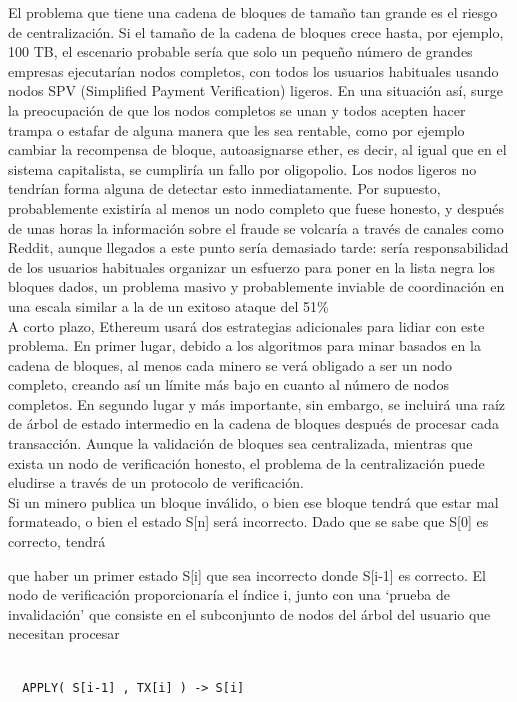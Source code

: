 \documentclass[11pt,a4paper]{article}
\begin{document}
El problema que tiene una cadena de bloques de tamaño tan grande es el riesgo de centralización. Si el tamaño de la cadena de bloques crece hasta, por ejemplo, 100 TB, el escenario probable sería que solo un pequeño número de grandes empresas ejecutarían nodos completos, con todos los usuarios habituales usando nodos SPV (Simplified Payment Verification) ligeros. En una situación así, surge la preocupación de que los nodos completos se unan y todos acepten hacer trampa o estafar de alguna manera que les sea rentable, como por ejemplo cambiar la recompensa de bloque, autoasignarse ether, es decir, al igual que en el sistema capitalista, se cumpliría un fallo por oligopolio. Los nodos ligeros no tendrían forma alguna de detectar esto inmediatamente. Por supuesto, probablemente existiría al menos un nodo completo que fuese honesto, y después de unas horas la información sobre el fraude se volcaría a través de canales como Reddit, aunque llegados a este punto sería demasiado tarde: sería responsabilidad de los usuarios habituales organizar un esfuerzo para poner en la lista negra los bloques dados, un problema masivo y probablemente inviable de coordinación en una escala similar a la de un exitoso ataque del 51\%\\

A corto plazo, Ethereum usará dos estrategias adicionales para lidiar con este problema. En primer lugar, debido a los algoritmos para minar basados en la cadena de bloques, al menos cada minero se verá obligado a ser un nodo completo, creando así un límite más bajo en cuanto al número de nodos completos. En segundo lugar y más importante, sin embargo, se incluirá una raíz de árbol de estado intermedio en la cadena de bloques después de procesar cada transacción. Aunque la validación de bloques sea centralizada, mientras que exista un nodo de verificación honesto, el problema de la centralización puede eludirse a través de un protocolo de verificación. \\ 
Si un minero publica un bloque inválido, o bien ese bloque tendrá que estar mal
formateado, o bien el estado S[n] será incorrecto. Dado que se sabe que S[0] es correcto, tendrá

que haber un primer estado S[i] que sea incorrecto donde S[i-1] es correcto. El nodo de
verificación proporcionaría el índice i, junto con una ‘prueba de invalidación’ que consiste en el subconjunto de nodos del árbol del usuario que necesitan procesar
\begin{lstlisting}

  APPLY( S[i-1] , TX[i] ) -> S[i]

\end{lstlisting}
\end{document}
